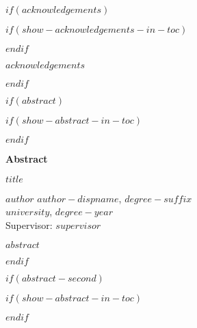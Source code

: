 \documentclass[letterpaper, $if(page-layout)$$page-layout$$else$nobind$endif$]{templates/ociamthesis}
\begin{document}
\begin{romanpages}
$if(acknowledgements)$

$if(show-acknowledgements-in-toc)$
\renewcommand{\numberstyleacks}{plain}
\renewcommand{\numberstyleabstract}{plain}
$endif$

\begin{acknowledgements}
 	$acknowledgements$
\end{acknowledgements}

$endif$


$if(abstract)$

$if(show-abstract-in-toc)$
\renewcommand{\numberstyleabstract}{plain}
$endif$


\begin{center}
  \textbf{Abstract}\\
  
  \vspace{18pt}
  
  \begin{spacing}{2}
    {\Large{\textbf{$title$}}}
  \end{spacing}

  \vspace{18pt}

  \begin{spacing}{1.4}
    $author$ 
    {\dispnamefont $author-dispname$}, 
    $degree-suffix$\\
    $university$, 
    $degree-year$\\
    \vspace{18pt}
    Supervisor: $supervisor$
  \end{spacing}

\end{center}

\begin{spacing}{1.5}
  \indent
  $abstract$
\end{spacing}


$endif$

$if(abstract-second)$

$if(show-abstract-in-toc)$
\renewcommand{\numberstyleabstract}{plain}
$endif$


\end{romanpages}
\end{document}
